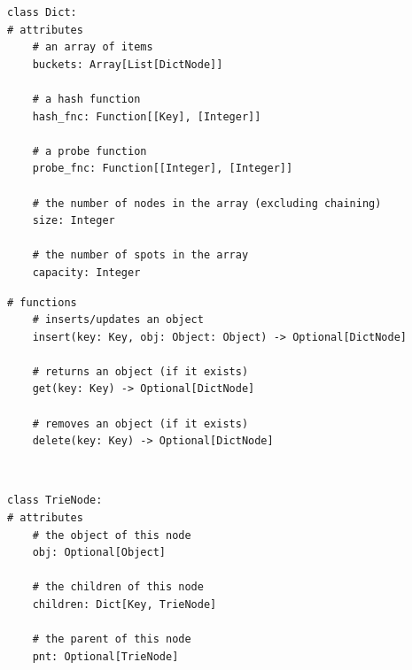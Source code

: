 \documentclass[mathserif, handout]{beamer}
\begin{document}
\begin{frame}[fragile]
  \vspace{-8mm}
  \begin{thmboxside}
    \begin{lstlisting}[style=mypython]
class Dict:
# attributes
    # an array of items
    buckets: Array[List[DictNode]]
    
    # a hash function
    hash_fnc: Function[[Key], [Integer]]

    # a probe function
    probe_fnc: Function[[Integer], [Integer]]
    
    # the number of nodes in the array (excluding chaining)
    size: Integer

    # the number of spots in the array
    capacity: Integer
\end{lstlisting}
  \end{thmboxside}
\end{frame}

\begin{frame}[fragile]
  \begin{thmboxbot}
    \begin{lstlisting}[style=mypython]
# functions
    # inserts/updates an object
    insert(key: Key, obj: Object: Object) -> Optional[DictNode]

    # returns an object (if it exists)
    get(key: Key) -> Optional[DictNode]

    # removes an object (if it exists)
    delete(key: Key) -> Optional[DictNode]
\end{lstlisting}
  \end{thmboxbot}
\end{frame}

\begin{frame}[fragile]
  \vspace{-10mm}
  \begin{thmboxtop}
     \\
    \begin{lstlisting}[style=mypython]
class TrieNode:
# attributes
    # the object of this node
    obj: Optional[Object]

    # the children of this node
    children: Dict[Key, TrieNode]

    # the parent of this node
    pnt: Optional[TrieNode]
\end{lstlisting}
  \end{thmboxtop}
\end{frame}
\end{document}

